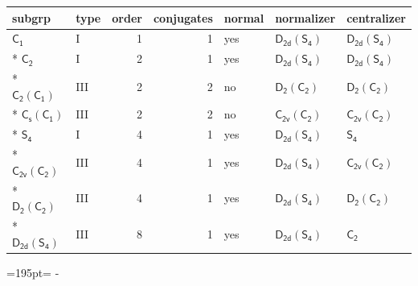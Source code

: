 \documentclass[10pt,a4paper]{article}
\newcommand{\needspace}[1]{\par\penalty-100\begingroup\dimen0=#1\relax\dimen2=\pagegoal
  \advance\dimen2-\pagetotal\ifdim\dimen0>\dimen2\relax\ifdim\dimen2>0pt\vfil\break\fi\fi
  \endgroup}
\numberwithin{equation}{section}
\newcommand{\grp}[1]{\mathsf{#1}}
\begin{document}
{\small\begin{longtable}{@{}llrrlll@{}}\toprule
subgrp & type & order & conjugates & normal & normalizer & centralizer\\\midrule\endhead
\bottomrule\endfoot\endlastfoot
\href{../../../rotation/data/pdf/C1.pdf}{$\grp{C_{1}}$} & I & 1 & 1 & yes & \href{D2d-S4.pdf}{$\grp{D_{2d}}(\grp{S_{4}})$} & \href{D2d-S4.pdf}{$\grp{D_{2d}}(\grp{S_{4}})$}\\*
\href{../../../rotation/data/pdf/C2.pdf}{$\grp{C_{2}}$} & I & 2 & 1 & yes & \href{D2d-S4.pdf}{$\grp{D_{2d}}(\grp{S_{4}})$} & \href{D2d-S4.pdf}{$\grp{D_{2d}}(\grp{S_{4}})$}\\*
\href{C2-C1.pdf}{$\grp{C_{2}}(\grp{C_{1}})$} & III & 2 & 2 & no & \href{D2-C2.pdf}{$\grp{D_{2}}(\grp{C_{2}})$} & \href{D2-C2.pdf}{$\grp{D_{2}}(\grp{C_{2}})$}\\*
\href{C1v-C1.pdf}{$\grp{C_{s}}(\grp{C_{1}})$} & III & 2 & 2 & no & \href{C2v-C2.pdf}{$\grp{C_{2v}}(\grp{C_{2}})$} & \href{C2v-C2.pdf}{$\grp{C_{2v}}(\grp{C_{2}})$}\\*
\href{../../../rotation/data/pdf/S4.pdf}{$\grp{S_{4}}$} & I & 4 & 1 & yes & \href{D2d-S4.pdf}{$\grp{D_{2d}}(\grp{S_{4}})$} & \href{../../../rotation/data/pdf/S4.pdf}{$\grp{S_{4}}$}\\*
\href{C2v-C2.pdf}{$\grp{C_{2v}}(\grp{C_{2}})$} & III & 4 & 1 & yes & \href{D2d-S4.pdf}{$\grp{D_{2d}}(\grp{S_{4}})$} & \href{C2v-C2.pdf}{$\grp{C_{2v}}(\grp{C_{2}})$}\\*
\href{D2-C2.pdf}{$\grp{D_{2}}(\grp{C_{2}})$} & III & 4 & 1 & yes & \href{D2d-S4.pdf}{$\grp{D_{2d}}(\grp{S_{4}})$} & \href{D2-C2.pdf}{$\grp{D_{2}}(\grp{C_{2}})$}\\*
\href{D2d-S4.pdf}{$\grp{D_{2d}}(\grp{S_{4}})$} & III & 8 & 1 & yes & \href{D2d-S4.pdf}{$\grp{D_{2d}}(\grp{S_{4}})$} & \href{../../../rotation/data/pdf/C2.pdf}{$\grp{C_{2}}$}\\
\bottomrule\end{longtable}}
\needspace{195pt}
\end{document}
